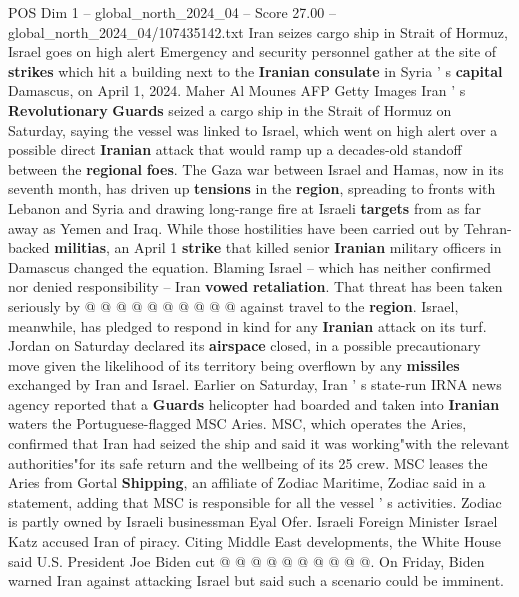 \begin{textsample}{POS Dim 1 – global\_north\_2024\_04 – Score 27.00 – global\_north\_2024\_04/107435142.txt}  \label{ex:f1_pos_158}
Iran seizes cargo ship in Strait of Hormuz, Israel goes on high alert Emergency and security personnel gather at the site of \textbf{strikes} which hit a building next to the \textbf{Iranian} \textbf{consulate} in Syria ' s \textbf{capital} Damascus, on April 1, 2024.
Maher Al Mounes AFP Getty Images Iran ' s \textbf{Revolutionary} \textbf{Guards} seized a cargo ship in the Strait of Hormuz on Saturday, saying the vessel was linked to Israel, which went on high alert over a possible direct \textbf{Iranian} attack that would ramp up a decades-old standoff between the \textbf{regional} \textbf{foes}.
The Gaza war between Israel and Hamas, now in its seventh month, has driven up \textbf{tensions} in the \textbf{region}, spreading to fronts with Lebanon and Syria and drawing long-range fire at Israeli \textbf{targets} from as far away as Yemen and Iraq.
While those hostilities have been carried out by Tehran-backed \textbf{militias}, an April 1 \textbf{strike} that killed senior \textbf{Iranian} military officers in Damascus changed the equation.
Blaming Israel -- which has neither confirmed nor denied responsibility -- Iran \textbf{vowed} \textbf{retaliation}.
That threat has been taken seriously by @ @ @ @ @ @ @ @ @ @ against travel to the \textbf{region}.
Israel, meanwhile, has pledged to respond in kind for any \textbf{Iranian} attack on its turf.
Jordan on Saturday declared its \textbf{airspace} closed, in a possible precautionary move given the likelihood of its territory being overflown by any \textbf{missiles} exchanged by Iran and Israel.
Earlier on Saturday, Iran ' s state-run IRNA news agency reported that a \textbf{Guards} helicopter had boarded and taken into \textbf{Iranian} waters the Portuguese-flagged MSC Aries.
MSC, which operates the Aries, confirmed that Iran had seized the ship and said it was working"with the relevant authorities"for its safe return and the wellbeing of its 25 crew.
MSC leases the Aries from Gortal \textbf{Shipping}, an affiliate of Zodiac Maritime, Zodiac said in a statement, adding that MSC is responsible for all the vessel ' s activities.
Zodiac is partly owned by Israeli businessman Eyal Ofer.
Israeli Foreign Minister Israel Katz accused Iran of piracy.
Citing Middle East developments, the White House said U.S.
President Joe Biden cut @ @ @ @ @ @ @ @ @ @.
On Friday, Biden warned Iran against attacking Israel but said such a scenario could be imminent.

\end{textsample}

